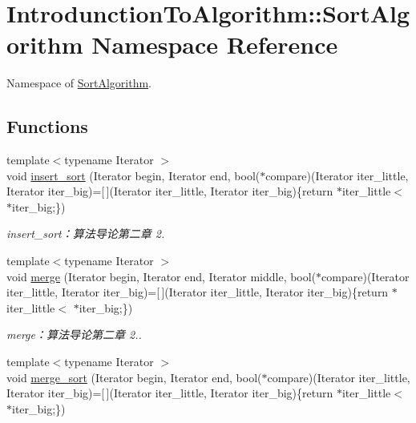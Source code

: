 \hypertarget{namespace_introdunction_to_algorithm_1_1_sort_algorithm}{}\section{Introdunction\+To\+Algorithm\+:\+:Sort\+Algorithm Namespace Reference}
\label{namespace_introdunction_to_algorithm_1_1_sort_algorithm}


Namespace of \hyperlink{namespace_introdunction_to_algorithm_1_1_sort_algorithm}{Sort\+Algorithm}.  


\subsection*{Functions}
\begin{DoxyCompactItemize}
\item 
{\footnotesize template$<$typename Iterator $>$ }\\void \hyperlink{namespace_introdunction_to_algorithm_1_1_sort_algorithm_afc447bdeb9c5e6a3611d8daa4edef33d}{insert\+\_\+sort} (Iterator begin, Iterator end, bool($\ast$compare)(Iterator iter\+\_\+little, Iterator iter\+\_\+big)=\mbox{[}$\,$\mbox{]}(Iterator iter\+\_\+little, Iterator iter\+\_\+big)\{return $\ast$iter\+\_\+little$<$ $\ast$iter\+\_\+big;\})
\begin{DoxyCompactList}\small\item\em insert\+\_\+sort：算法导论第二章 2. \end{DoxyCompactList}\item 
{\footnotesize template$<$typename Iterator $>$ }\\void \hyperlink{namespace_introdunction_to_algorithm_1_1_sort_algorithm_a1c50cf3a021ad0abf02a3fd398a42dda}{merge} (Iterator begin, Iterator end, Iterator middle, bool($\ast$compare)(Iterator iter\+\_\+little, Iterator iter\+\_\+big)=\mbox{[}$\,$\mbox{]}(Iterator iter\+\_\+little, Iterator iter\+\_\+big)\{return $\ast$iter\+\_\+little$<$ $\ast$iter\+\_\+big;\})
\begin{DoxyCompactList}\small\item\em merge：算法导论第二章 2.. \end{DoxyCompactList}\item 
{\footnotesize template$<$typename Iterator $>$ }\\void \hyperlink{namespace_introdunction_to_algorithm_1_1_sort_algorithm_a01bb990e5f682e3cb75dd54d792fae50}{merge\+\_\+sort} (Iterator begin, Iterator end, bool($\ast$compare)(Iterator iter\+\_\+little, Iterator iter\+\_\+big)=\mbox{[}$\,$\mbox{]}(Iterator iter\+\_\+little, Iterator iter\+\_\+big)\{return $\ast$iter\+\_\+little$<$ $\ast$iter\+\_\+big;\})

\end{DoxyCompactItemize}

